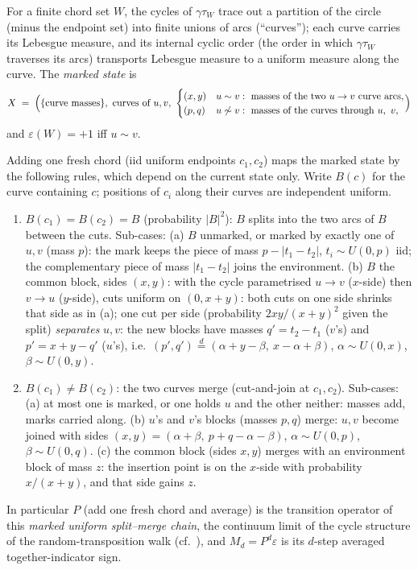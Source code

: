 For a finite chord set $W$, the cycles of $\gamma\tau_W$ trace out a
partition of the circle (minus the endpoint set) into finite unions of
arcs (``curves''); each curve carries its Lebesgue measure, and its
internal cyclic order (the order in which $\gamma\tau_W$ traverses its
arcs) transports Lebesgue measure to a uniform measure along the
curve.  The \emph{marked state} is
\[
X \;=\;\Bigl(\{\text{curve masses}\}, \ \text{curves of }u,v,\
\begin{cases}
(x,y) & u\sim v:\ \text{masses of the two }u\to v\text{ curve arcs},\\
(p,q) & u\not\sim v:\ \text{masses of the curves through }u,\ v,
\end{cases}\Bigr)
\]
and $\varepsilon(W)=+1$ iff $u\sim v$.

\begin{lemma}[fresh chord $=$ one split--merge move]
\label{lem:splitmerge}
Adding one fresh chord (iid uniform endpoints $c_1,c_2$) maps the
marked state by the following rules, which depend on the current state
only.  Write $B(c)$ for the curve containing $c$; positions of $c_i$
along their curves are independent uniform.
\begin{enumerate}[leftmargin=2em]
\item $B(c_1)=B(c_2)=B$ (probability $|B|^2$): $B$ splits into the two
arcs of $B$ between the cuts.  Sub-cases:
 (a) $B$ unmarked, or marked by exactly one of $u,v$ (mass $p$): the
 mark keeps the piece of mass $p-|t_1-t_2|$, $t_i\sim U(0,p)$ iid; the
 complementary piece of mass $|t_1-t_2|$ joins the environment.
 (b) $B$ the common block, sides $(x,y)$: with the cycle parametrised
 $u\to v$ ($x$-side) then $v\to u$ ($y$-side), cuts uniform on
 $(0,x{+}y)$: both cuts on one side shrinks that side as in (a);
 one cut per side (probability $2xy/(x{+}y)^2$ given the split)
 \emph{separates} $u,v$: the new blocks have masses
 $q'=t_2-t_1$ ($v$'s) and $p'=x+y-q'$ ($u$'s), i.e.\
 $(p',q')\overset{d}{=}(\alpha+y-\beta,\ x-\alpha+\beta)$,
 $\alpha\sim U(0,x)$, $\beta\sim U(0,y)$.
\item $B(c_1)\ne B(c_2)$: the two curves merge (cut-and-join at
$c_1,c_2$).  Sub-cases: (a) at most one is marked, or one holds $u$
and the other neither: masses add, marks carried along.  (b) $u$'s and
$v$'s blocks (masses $p,q$) merge: $u,v$ become joined with sides
$(x,y)=(\alpha+\beta,\ p+q-\alpha-\beta)$, $\alpha\sim U(0,p)$,
$\beta\sim U(0,q)$.  (c) the common block (sides $x,y$) merges with an
environment block of mass $z$: the insertion point is on the $x$-side
with probability $x/(x{+}y)$, and that side gains $z$.
\end{enumerate}
In particular $P$ (add one fresh chord and average) is the transition
operator of this \emph{marked uniform split--merge chain}, the
continuum limit of the cycle structure of the random-transposition
walk (cf.\ \cite{Sch05}), and
$M_d=P^d\varepsilon$ is its $d$-step averaged together-indicator sign.
\end{lemma}

